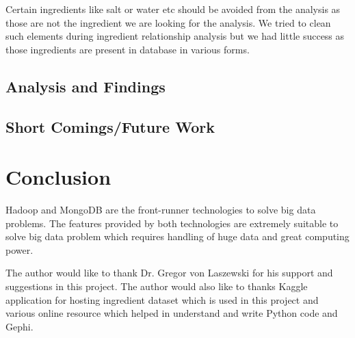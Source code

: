 \documentclass[sigconf]{acmart}
\begin{document}
Certain ingredients like salt or water etc should be avoided from the analysis as those are not the ingredient we are looking for the analysis. We tried to clean such elements during ingredient relationship analysis but we had little success as those ingredients are present in database in various forms.  

\subsection{Analysis and Findings}


\subsection{Short Comings/Future Work}



\section{Conclusion}
Hadoop and MongoDB are the front-runner technologies to solve big data problems. The features provided by both technologies are extremely suitable to solve big data problem which requires handling of huge data and great computing power.

\begin{acks}

  The author would like to thank Dr. Gregor von Laszewski for his
  support and suggestions in this project. The author would also like to thanks Kaggle application for hosting ingredient dataset which is used in this project and various online resource which helped in understand and write Python code and Gephi.  

\end{acks}


 

\appendix


\end{document}

